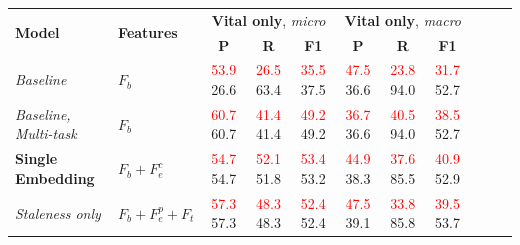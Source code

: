 \documentclass{article}
\newcommand{\sub}[1]{\textcolor{red}{#1}}
\begin{document}
\begin{table}[tb]
{\small
\begin{center}
\begin{tabular}{llccccccccc} 
\toprule
  \multirow{2}{*}{\textbf{Model}} & 
  \multirow{2}{*}{\textbf{Features}} & 
  \multicolumn{3}{c}{\textbf{Vital only}, \emph{micro}} &
  \multicolumn{3}{c}{\textbf{Vital only}, \emph{macro}}
\\ 
  \cmidrule(lr){3-5}
  \cmidrule(lr){6-8}
&   & 
  \textbf{P} & \textbf{R} & \textbf{F1} & 
  \textbf{P} & \textbf{R} & \textbf{F1} \\ 
\midrule
{\textit{Baseline}} & $F_b$ &
  \sub{53.9}  \hspace{1mm} 26.6 & \sub{26.5} \hspace{1mm} 63.4 & \sub{35.5} \hspace{1mm} 37.5 &
  \sub{47.5}  \hspace{1mm} 36.6 & \sub{23.8} \hspace{1mm} 94.0 & \sub{31.7} \hspace{1mm} 52.7 \\
{\textit{Baseline, Multi-task}} & $F_b$ &
  \sub{60.7} \hspace{1mm} 60.7 & \sub{41.4} \hspace{1mm} 41.4 & \sub{49.2} \hspace{1mm} 49.2 &
  \sub{36.7} \hspace{1mm} 36.6 & \sub{40.5} \hspace{1mm} 94.0 & \sub{38.5} \hspace{1mm} 52.7 \\
{\textbf{Single Embedding}} & $F_b+F_e^c$ & 
  \sub{54.7} \hspace{1mm} 54.7 & \sub{52.1} \hspace{1mm} 51.8 & \sub{53.4} \hspace{1mm} 53.2 &
  \sub{44.9} \hspace{1mm} 38.3 & \sub{37.6} \hspace{1mm} 85.5 & \sub{40.9} \hspace{1mm} 52.9 \\
\hspace{2mm} {\textit{Staleness only}} & $F_b+F_e^p+F_t$ & 
  \sub{57.3} \hspace{1mm} 57.3 & \sub{48.3} \hspace{1mm} 48.3 & \sub{52.4} \hspace{1mm} 52.4 &
  \sub{47.5} \hspace{1mm} 39.1 & \sub{33.8} \hspace{1mm} 85.8 & \sub{39.5} \hspace{1mm} 53.7 \\

\end{tabular}
\end{center}}
\end{table}
\end{document}
